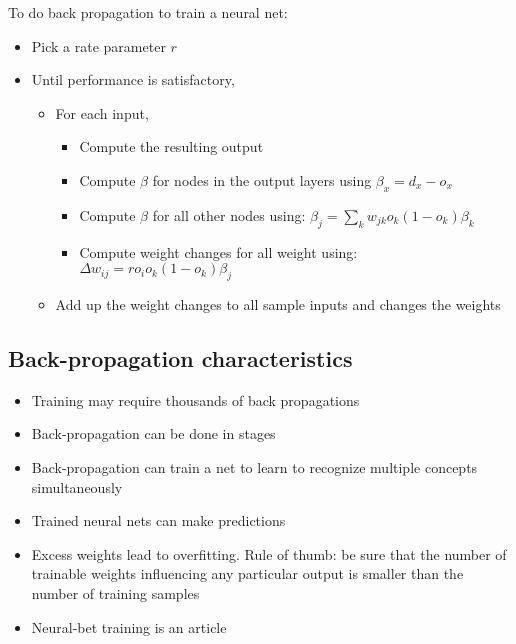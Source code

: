 To do back propagation to train a neural net:
\begin{itemize}
  \item Pick a rate parameter $r$
  \item Until performance is satisfactory,
    \begin{itemize}
      \item For each input,
        \begin{itemize}
          \item Compute the resulting output
          \item Compute $\beta$ for nodes in the output layers
            using $\beta_{x} = d_x - o_x$
          \item Compute $\beta$ for all other nodes using:
            \begin{math}
              \beta_j = \sum_{k}{w_{jk}o_k(1-o_k)\beta_k}
            \end{math}
          \item Compute weight changes for all weight using:
            \begin{math}
              \Delta{w_{ij}} = ro_io_k(1-o_k)\beta_j
            \end{math}
        \end{itemize}
      \item Add up the weight changes to all sample inputs and
        changes the weights
    \end{itemize}
\end{itemize}

\subsection{Back-propagation characteristics}

\begin{itemize}
  \item Training may require thousands of back propagations
  \item Back-propagation can be done in stages
  \item Back-propagation can train a net to learn to recognize
    multiple concepts simultaneously
  \item Trained neural nets can make predictions
  \item Excess weights lead to overfitting. Rule of thumb: be sure
    that the number of trainable weights influencing any
    particular output is smaller than the number of training
    samples
  \item Neural-bet training is an article
\end{itemize}

